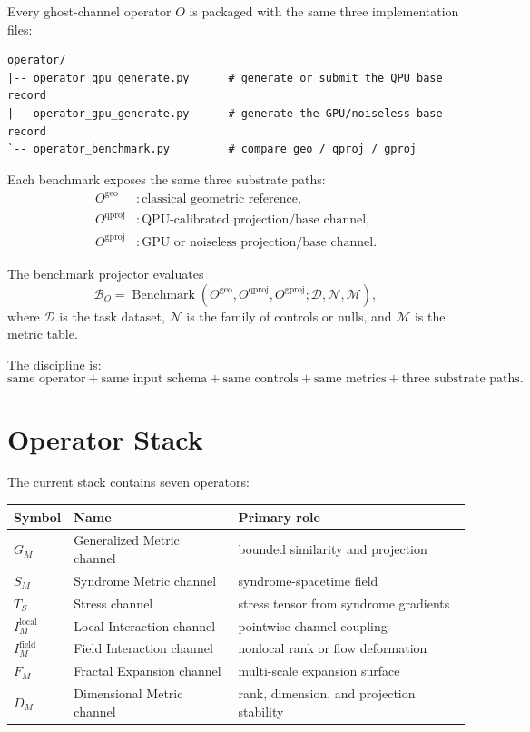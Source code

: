 \documentclass[11pt]{article}
\newcommand{\Gm}{G_M}
\newcommand{\Sm}{S_M}
\newcommand{\Ts}{T_S}
\newcommand{\Iml}{I_M^{\mathrm{local}}}
\newcommand{\Imf}{I_M^{\mathrm{field}}}
\newcommand{\Fm}{F_M}
\newcommand{\Dm}{D_M}
\newcommand{\geo}{\mathrm{geo}}
\newcommand{\qproj}{\mathrm{qproj}}
\newcommand{\gproj}{\mathrm{gproj}}
\begin{document}
Every ghost-channel operator \(O\) is packaged with the same three implementation
files:
\begin{lstlisting}[style=repo]
operator/
|-- operator_qpu_generate.py      # generate or submit the QPU base record
|-- operator_gpu_generate.py      # generate the GPU/noiseless base record
`-- operator_benchmark.py         # compare geo / qproj / gproj
\end{lstlisting}

Each benchmark exposes the same three substrate paths:
\begin{align}
  O^{\geo}   &: \text{classical geometric reference}, \\
  O^{\qproj} &: \text{QPU-calibrated projection/base channel}, \\
  O^{\gproj} &: \text{GPU or noiseless projection/base channel}.
\end{align}

The benchmark projector evaluates
\begin{equation}
  \mathcal{B}_O =
  \operatorname{Benchmark}\!\left(
    O^{\geo}, O^{\qproj}, O^{\gproj};
    \mathcal{D}, \mathcal{N}, \mathcal{M}
  \right),
\end{equation}
where \(\mathcal{D}\) is the task dataset, \(\mathcal{N}\) is the family of
controls or nulls, and \(\mathcal{M}\) is the metric table.

The discipline is:
\begin{equation}
  \text{same operator}
  + \text{same input schema}
  + \text{same controls}
  + \text{same metrics}
  + \text{three substrate paths}.
\end{equation}

\section{Operator Stack}

The current stack contains seven operators:
\begin{center}
\begin{longtable}{lll}
\toprule
\textbf{Symbol} & \textbf{Name} & \textbf{Primary role} \\
\midrule
\(\Gm\) & Generalized Metric channel & bounded similarity and projection \\
\(\Sm\) & Syndrome Metric channel & syndrome-spacetime field \\
\(\Ts\) & Stress channel & stress tensor from syndrome gradients \\
\(\Iml\) & Local Interaction channel & pointwise channel coupling \\
\(\Imf\) & Field Interaction channel & nonlocal rank or flow deformation \\
\(\Fm\) & Fractal Expansion channel & multi-scale expansion surface \\
\(\Dm\) & Dimensional Metric channel & rank, dimension, and projection stability \\
\bottomrule
\end{longtable}
\end{center}
\end{document}
